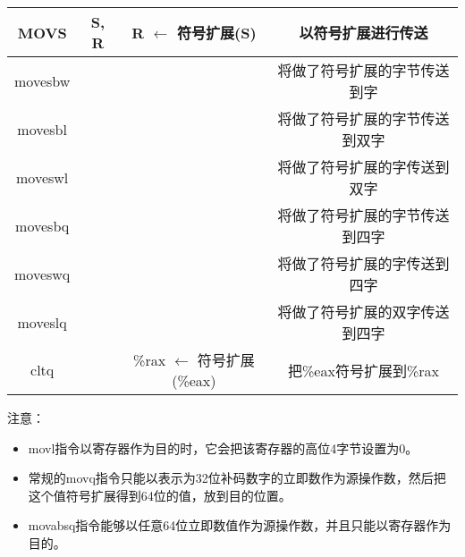 \begin{table}[H]
\begin{tabular}{|c c|c|c|}
        \hline
        MOVS                              & S, R        & R $\leftarrow$ 符号扩展(S)         & 以符号扩展进行传送        \\
        \hline
        movesbw                           &             &                                & 将做了符号扩展的字节传送到字   \\
        movesbl                           &             &                                & 将做了符号扩展的字节传送到双字  \\
        moveswl                           &             &                                & 将做了符号扩展的字传送到双字   \\
        movesbq                           &             &                                & 将做了符号扩展的字节传送到四字  \\
        moveswq                           &             &                                & 将做了符号扩展的字传送到四字   \\
        moveslq                           &             &                                & 将做了符号扩展的双字传送到四字  \\
        cltq                              &             & \%rax $\leftarrow$ 符号扩展(\%eax) & 把\%eax符号扩展到\%rax \\
        \hline
    \end{tabular}
\end{table}

注意：
\begin{itemize}
    \item movl指令以寄存器作为目的时，它会把该寄存器的高位4字节设置为0。
    \item 常规的movq指令只能以表示为32位补码数字的立即数作为源操作数，然后把这个值符号扩展得到64位的值，放到目的位置。
    \item movabsq指令能够以任意64位立即数值作为源操作数，并且只能以寄存器作为目的。
\end{itemize}

